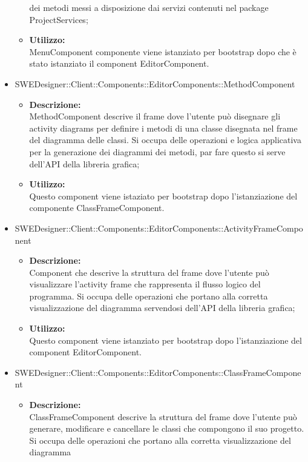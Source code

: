 \begin{itemize}
\begin{itemize}
				dei metodi messi a disposizione dai servizi contenuti nel package
				ProjectServices;
				\item \textbf{Utilizzo: }\\
				MenuComponent componente viene istanziato per bootstrap dopo che è stato
				istanziato il component EditorComponent.
			\end{itemize}
			\item SWEDesigner::Client::Components::EditorComponents::MethodComponent
			\begin{itemize}
				\item \textbf{Descrizione: }\\
				MethodComponent descrive il frame dove l'utente può disegnare gli activity
				diagrams per definire i metodi di una classe disegnata nel frame del
				diagramma delle classi. Si occupa delle operazioni e logica applicativa per
				la generazione dei diagrammi dei metodi, par fare questo si serve dell'API
				della libreria grafica;
				\item \textbf{Utilizzo: }\\
				Questo component viene istaziato per bootstrap dopo l'istanziazione del
				componente ClassFrameComponent.
			\end{itemize}
			\item SWEDesigner::Client::Components::EditorComponents::ActivityFrameComponent
			\begin{itemize}
				\item \textbf{Descrizione: }\\
				Component che descrive la struttura del frame dove l'utente può visualizzare
				l'activity frame che rappresenta il flusso logico del programma. Si occupa
				delle operazioni che portano alla corretta visualizzazione del diagramma
				servendosi dell'API della libreria grafica;
				\item \textbf{Utilizzo: }\\
				Questo component viene istanziato per bootstrap dopo l'istanziazione
				del component EditorComponent.
			\end{itemize}
			\item SWEDesigner::Client::Components::EditorComponents::ClassFrameComponent
			\begin{itemize}
				\item \textbf{Descrizione: }\\
				ClassFrameComponent descrive la struttura del frame dove l'utente può
				generare, modificare e cancellare le classi che compongono il suo progetto.
				Si occupa delle operazioni che portano alla corretta visualizzazione del diagramma

\end{itemize}
\end{itemize}
